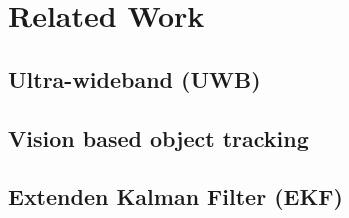 
\setcounter{chapter}{1}

\chapter{Related Work}

\section{Ultra-wideband (UWB)} 

\section{Vision based object tracking}

\section{Extenden Kalman Filter (EKF)}
